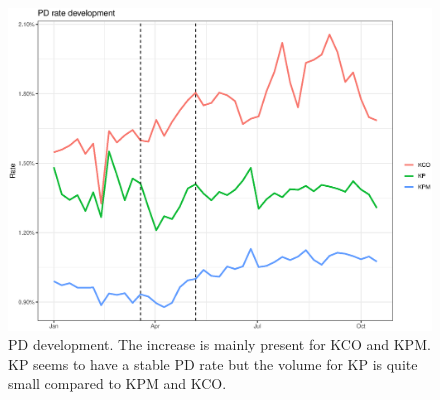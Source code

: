 \begin{figure}[!ht]
  \centering
  \includegraphics[width=5in,trim={0 0 0 0},clip]{content/figures/pd_dev_nl_as.eps} 
  \caption{PD development. The increase is mainly present for KCO and KPM. KP seems to have a stable PD rate but the volume for KP is quite small compared to KPM and KCO.}
  \label{fig:pd_dev_as}
\end{figure}

%
%
%

